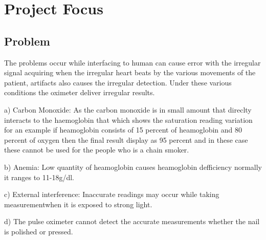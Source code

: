 

\chapter{Project Focus}\label{chapter:firstchapter} %

\label{ChapterX} %


\section{Problem}\label{sec:firstsection}

The problems occur while interfacing to human can cause error with the irregular signal acquiring when the irregular heart beats by the various movements of the patient, artifacts also causes the irregular detection.
Under these various conditions the oximeter deliver irregular results.

a) Carbon Monoxide: As the carbon monoxide is in small amount that direclty interacts to the haemoglobin that which shows the saturation reading variation for an example if heamoglobin consists of 15 percent of heamoglobin and 80 percent of oxygen then the final result display as 95 percent and in these case these cannot be used for the people who is a chain smoker.

b) Anemia: Low quantity of heamoglobin causes heamoglobin defficiency normally it ranges to 11-18g/dl.

c) External interference: Inaccurate readings may occur while taking measurementwhen it is exposed to strong light.

d) The pulse oximeter cannot detect the accurate measurements whether the nail is polished or pressed.



